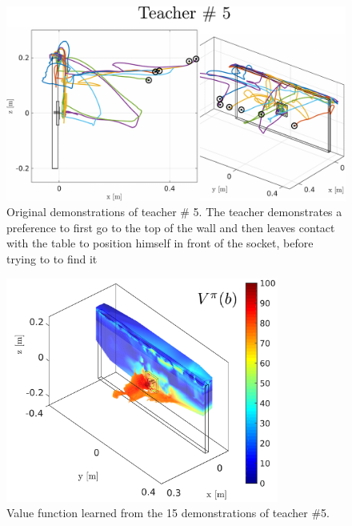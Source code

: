 \begin{figure}
 \centering
    \includegraphics[width=\textwidth]{./ch4-PiH/Figures/Results1/experiment4/subject5.pdf}
    \caption{Original demonstrations of teacher \# 5. The teacher demonstrates a preference
    to first go to the top of the wall and then leaves contact with the table to position himself in front of the socket, before trying to 
    to find it}
    \label{fig:subj_5_traj}
 \end{figure}
 
\begin{figure}
 \centering
 \includegraphics[width=0.8\textwidth]{./ch4-PiH/Figures/Results1/experiment4/value_subj_5.pdf}
 \caption{Value function learned from the 15 demonstrations of teacher \#5.}
 \label{fig:value_function_subj_5}
\end{figure}
 
